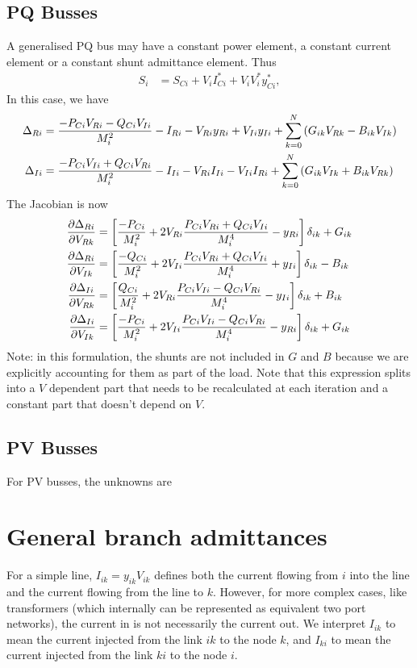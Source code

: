 \documentclass[11pt]{article}
\begin{document}
\subsection{PQ Busses}
A generalised PQ bus may have a constant power element, a constant current element or a constant shunt admittance element. Thus
\begin{align}
S_i &= S_{Ci} + V_iI^*_{Ci} + V_iV^*_iy^*_{Ci},
\end{align}
In this case, we have
\begin{align}
\Delta_{Ri} &= \frac{-P_{Ci}V_{Ri}-Q_{Ci}V_{Ii}}{M^2_i} - I_{Ri} - V_{Ri}y_{Ri} + V_{Ii}y_{Ii} + \sum_{k=0}^N\left(G_{ik}V_{Rk} - B_{ik}V_{Ik}\right)\notag \\
\Delta_{Ii} &= \frac{-P_{Ci}V_{Ii}+Q_{Ci}V_{Ri}}{M^2_i} - I_{Ii} -V_{Ri}I_{Ii} - V_{Ii}I_{Ri} + \sum_{k=0}^N\left(G_{ik}V_{Ik} + B_{ik}V_{Rk}\right)
\end{align}
The Jacobian is now
\begin{align}
\frac{\partial \Delta_{Ri}}{\partial V_{Rk}} &= \left[\frac{-P_{Ci}}{M^2_i} + 2V_{Ri}\frac{P_{Ci}V_{Ri} + Q_{Ci}V_{Ii}}{M^4_i} - y_{Ri}\right]\delta_{ik}+G_{ik} \notag \\
\frac{\partial \Delta_{Ri}}{\partial V_{Ik}} &= \left[\frac{-Q_{Ci}}{M^2_i} + 2V_{Ii}\frac{P_{Ci}V_{Ri} + Q_{Ci}V_{Ii}}{M^4_i} + y_{Ii}\right]\delta_{ik}-B_{ik} \notag \\
\frac{\partial \Delta_{Ii}}{\partial V_{Rk}} &= \left[\frac{Q_{Ci}}{M^2_i} + 2V_{Ri}\frac{P_{Ci}V_{Ii} - Q_{Ci}V_{Ri}}{M^4_i} - y_{Ii}\right]\delta_{ik}+B_{ik} \notag \\
\frac{\partial \Delta_{Ii}}{\partial V_{Ik}} &= \left[\frac{-P_{Ci}}{M^2_i} + 2V_{Ii}\frac{P_{Ci}V_{Ii} - Q_{Ci}V_{Ri}}{M^4_i} - y_{Ri}\right]\delta_{ik}+G_{ik}
\end{align}
Note: in this formulation, the shunts are not included in $G$ and $B$ because we are explicitly accounting for them as part of the load. Note that this expression splits into a $V$ dependent part that needs to be recalculated at each iteration and a constant part that doesn't depend on $V$.
\subsection{PV Busses}
For PV busses, the unknowns are 

\section{General branch admittances}
For a simple line, $I_{ik} = y_{ik}V_{ik}$ defines both the current flowing from $i$ into the line and the current flowing from the line to $k$. However, for more complex cases, like transformers (which internally can be represented as equivalent two port networks), the current in is not necessarily the current out. We interpret $I_{ik}$ to mean the current injected from the link $ik$ to the node $k$, and $I_{ki}$ to mean the current injected from the link $ki$ to the node $i$.
\end{document}
